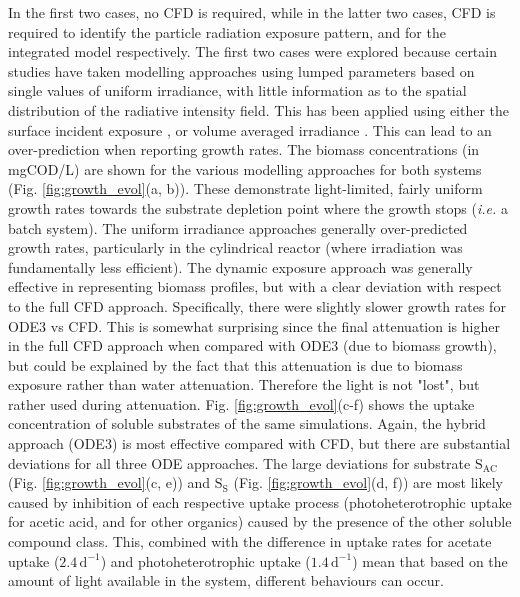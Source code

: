 In the first two cases, no CFD is required, while in the latter two cases, CFD is required to identify the particle radiation exposure pattern, and for the integrated model respectively. The first two cases were explored because certain studies have taken modelling approaches using lumped parameters based on single values of uniform irradiance, with little information as to the spatial distribution of the radiative intensity field. This has been applied using either the surface incident exposure \cite{uyar2007, zhou2014}, or volume averaged irradiance \cite{molinagrima1996, bordel2009}. This can lead to an over-prediction when reporting growth rates.
\skippingparagraph
The biomass concentrations (in mgCOD/L) are shown for the various modelling approaches for both systems (Fig. \ref{fig:growth_evol}(a, b)). These demonstrate light-limited, fairly uniform growth rates towards the substrate depletion point where the growth stops (\textit{i.e.} a batch system). The uniform irradiance approaches generally over-predicted growth rates, particularly in the cylindrical reactor (where irradiation was fundamentally less efficient). The dynamic exposure approach was generally effective in representing biomass profiles, but with a clear deviation with respect to the full CFD approach. Specifically, there were slightly slower growth rates for ODE3 vs CFD. This is somewhat surprising since the final attenuation is higher in the full CFD approach when compared with ODE3 (due to biomass growth), but could be explained by the fact that this attenuation is due to biomass exposure rather than water attenuation. Therefore the light is not "lost", but rather used during attenuation.
\skippingparagraph
Fig. \ref{fig:growth_evol}(c-f) shows the uptake concentration of soluble substrates of the same simulations. Again, the hybrid approach (ODE3) is most effective compared with CFD, but there are substantial deviations for all three ODE approaches. The large deviations for substrate $\mathrm{S_{AC}}$ (Fig. \ref{fig:growth_evol}(c, e)) and $\mathrm{S_S}$ (Fig. \ref{fig:growth_evol}(d, f)) are most likely caused by inhibition of each respective uptake process (photoheterotrophic uptake for acetic acid, and for other organics) caused by the presence of the other soluble compound class. This, combined with the difference in uptake rates for acetate uptake ($\mathrm{2.4\, d^{-1}}$) and photoheterotrophic uptake ($\mathrm{1.4\, d^{-1}}$) \cite{puyol2017} mean that based on the amount of light available in the system, different behaviours can occur.  
\skippingparagraph
